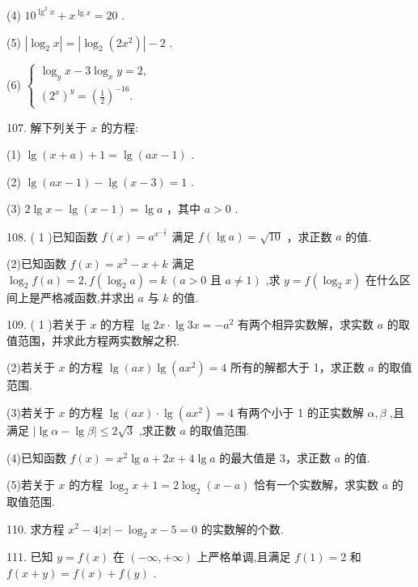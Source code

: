 \documentclass[10pt]{article}
\begin{document}
(4) \({10}^{{\lg }^{2}x} + {x}^{\lg x} = {20}\) .

(5) \(\left| {{\log }_{2}x}\right|  = \left| {{\log }_{2}\left( {2{x}^{2}}\right) }\right|  - 2\) .

(6) \(\left\{  \begin{array}{l} {\log }_{y}x - 3{\log }_{x}y = 2, \\  {\left( {2}^{x}\right) }^{y} = {\left( \frac{1}{2}\right) }^{-{16}}. \end{array}\right.\)

107. 解下列关于 \(x\) 的方程:

(1) \(\lg \left( {x + a}\right)  + 1 = \lg \left( {{ax} - 1}\right)\) .

(2) \(\lg \left( {{ax} - 1}\right)  - \lg \left( {x - 3}\right)  = 1\) .

(3) \(2\lg x - \lg \left( {x - 1}\right)  = \lg a\) ，其中 \(a > 0\) .

108. ( 1 )已知函数 \(f\left( x\right)  = {a}^{{x}^{-\frac{1}{2}}}\) 满足 \(f\left( {\lg a}\right)  = \sqrt{10}\) ，求正数 \(a\) 的值.

(2)已知函数 \(f\left( x\right)  = {x}^{2} - x + k\) 满足 \({\log }_{2}f\left( a\right)  = 2,f\left( {{\log }_{2}a}\right)  = k\;\left( {a > 0\text{ 且 }a \neq  1}\right)\) ,求 \(y = f\left( {{\log }_{2}x}\right)\) 在什么区间上是严格减函数,并求出 \(a\) 与 \(k\) 的值.

109. ( 1 )若关于 \(x\) 的方程 \(\lg {2x} \cdot  \lg {3x} =  - {a}^{2}\) 有两个相异实数解，求实数 \(a\) 的取值范围，并求此方程两实数解之积.

(2)若关于 \(x\) 的方程 \(\lg \left( {ax}\right) \lg \left( {a{x}^{2}}\right)  = 4\) 所有的解都大于 1，求正数 \(a\) 的取值范围.

(3)若关于 \(x\) 的方程 \(\lg \left( {ax}\right)  \cdot  \lg \left( {a{x}^{2}}\right)  = 4\) 有两个小于 1 的正实数解 \(\alpha ,\beta\) ,且满足 \(\left| {\lg \alpha  - \lg \beta }\right|  \leq  2\sqrt{3}\) ,求正数 \(a\) 的取值范围.

(4)已知函数 \(f\left( x\right)  = {x}^{2}\lg a + {2x} + {4\lg }a\) 的最大值是 3，求正数 \(a\) 的值.

(5)若关于 \(x\) 的方程 \({\log }_{2}x + 1 = 2{\log }_{2}\left( {x - a}\right)\) 恰有一个实数解，求实数 \(a\) 的取值范围.

110. 求方程 \({x}^{2} - 4\left| x\right|  - {\log }_{2}x - 5 = 0\) 的实数解的个数.

111. 已知 \(y = f\left( x\right)\) 在 \(\left( {-\infty , + \infty }\right)\) 上严格单调,且满足 \(f\left( 1\right)  = 2\) 和 \(f\left( {x + y}\right)  = f\left( x\right)  + f\left( y\right)\) .
\end{document}
